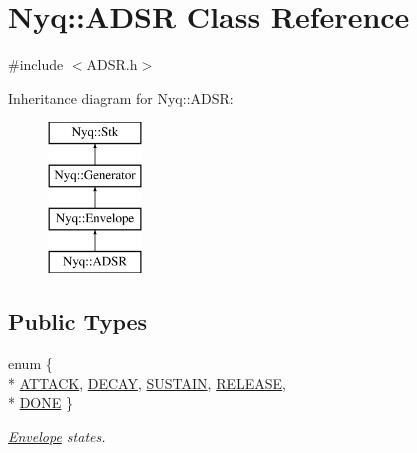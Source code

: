 \hypertarget{class_nyq_1_1_a_d_s_r}{}\section{Nyq\+:\+:A\+D\+SR Class Reference}
\label{class_nyq_1_1_a_d_s_r}


{\ttfamily \#include $<$A\+D\+S\+R.\+h$>$}

Inheritance diagram for Nyq\+:\+:A\+D\+SR\+:\begin{figure}[H]
\begin{center}
\leavevmode
\includegraphics[height=4.000000cm]{class_nyq_1_1_a_d_s_r}
\end{center}
\end{figure}
\subsection*{Public Types}
\begin{DoxyCompactItemize}
\item 
enum \{ \\*
\hyperlink{class_nyq_1_1_a_d_s_r_ab800aaf78adb724e9df53dbbb3080fcca03ee2ed1032efbbb7e4a1a031be5aa09}{A\+T\+T\+A\+CK}, 
\hyperlink{class_nyq_1_1_a_d_s_r_ab800aaf78adb724e9df53dbbb3080fcca6df823b9981e6ae2da0a020ee7e985de}{D\+E\+C\+AY}, 
\hyperlink{class_nyq_1_1_a_d_s_r_ab800aaf78adb724e9df53dbbb3080fcca7c0212dc7f2d2360e6d4dd94ba83d129}{S\+U\+S\+T\+A\+IN}, 
\hyperlink{class_nyq_1_1_a_d_s_r_ab800aaf78adb724e9df53dbbb3080fccab5aaef8c0d6b0140ece1a6147cb76926}{R\+E\+L\+E\+A\+SE}, 
\\*
\hyperlink{class_nyq_1_1_a_d_s_r_ab800aaf78adb724e9df53dbbb3080fcca8791313eb3a2e0100428dc0f8a61a66f}{D\+O\+NE}
 \}\begin{DoxyCompactList}\small\item\em \hyperlink{class_nyq_1_1_envelope}{Envelope} states. \end{DoxyCompactList}
\end{DoxyCompactItemize}
